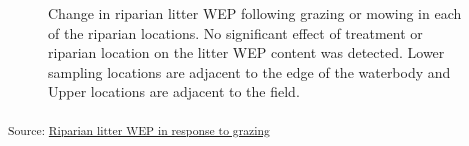 \documentclass[
]{agujournal2019}
\begin{document}
\begin{figure}[H]


\caption{\label{fig-litter-wep}Change in riparian litter WEP following
grazing or mowing in each of the riparian locations. No significant
effect of treatment or riparian location on the litter WEP content was
detected. Lower sampling locations are adjacent to the edge of the
waterbody and Upper locations are adjacent to the field.}

\end{figure}%

\textsubscript{Source:
\href{https://alex-koiter.github.io/riparian-grazing-manuscript/notebooks/02_Litter_analysis-preview.html\#cell-fig-litter-WEP}{Riparian
litter WEP in response to grazing}}
\end{document}
